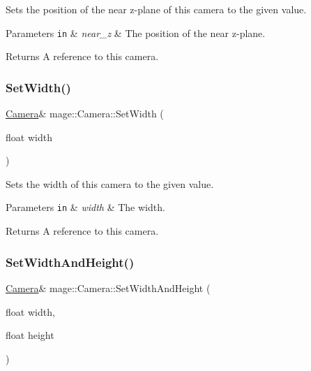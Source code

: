Sets the position of the near z-\/plane of this camera to the given value.


\begin{DoxyParams}[1]{Parameters}
\mbox{\tt in}  & {\em near\+\_\+z} & The position of the near z-\/plane. \\
\hline
\end{DoxyParams}
\begin{DoxyReturn}{Returns}
A reference to this camera. 
\end{DoxyReturn}
\hypertarget{classmage_1_1_camera_acddfb1108ee8f7e937833286c082dadf}{}\label{classmage_1_1_camera_acddfb1108ee8f7e937833286c082dadf} 
\subsubsection{\texorpdfstring{Set\+Width()}{SetWidth()}}
{\footnotesize\ttfamily \hyperlink{classmage_1_1_camera}{Camera}\& mage\+::\+Camera\+::\+Set\+Width (\begin{DoxyParamCaption}\item[{float}]{width }\end{DoxyParamCaption})}

Sets the width of this camera to the given value.


\begin{DoxyParams}[1]{Parameters}
\mbox{\tt in}  & {\em width} & The width. \\
\hline
\end{DoxyParams}
\begin{DoxyReturn}{Returns}
A reference to this camera. 
\end{DoxyReturn}
\hypertarget{classmage_1_1_camera_a275b6908662c0cde4fec5485ff04a846}{}\label{classmage_1_1_camera_a275b6908662c0cde4fec5485ff04a846} 
\subsubsection{\texorpdfstring{Set\+Width\+And\+Height()}{SetWidthAndHeight()}}
{\footnotesize\ttfamily \hyperlink{classmage_1_1_camera}{Camera}\& mage\+::\+Camera\+::\+Set\+Width\+And\+Height (\begin{DoxyParamCaption}\item[{float}]{width,  }\item[{float}]{height }\end{DoxyParamCaption})}

